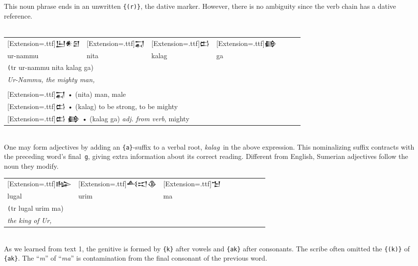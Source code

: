 \documentclass[a4paper,12pt]{book}
\newcommand{\fcn}{\setmainfont{Akkadian}[Extension=.ttf]}
\newcommand{\fcm}{\large\setmainfont{Akkadian}[Extension=.ttf]}
\begin{document}
This noun phrase ends in an unwritten \verb|{(r)}|,
the dative marker. However, there is no ambiguity
since the verb chain has a dative reference.\\

\verb||\\
\begin{tabular}[!h]{l l l l l l l}
  \fcm 𒌨𒀭𒇉 &\fcm 𒍑
  &\fcm 𒆗 &\fcm 𒂵\\
  ur-nammu & nita & kalag & ga\\
  \multicolumn{4}{l}{\texttt (tr ur-nammu nita kalag ga)}\\
  \multicolumn{4}{l}{\em Ur-Nammu, the mighty man,}\\
  \hline\\
  \multicolumn{4}{l}{{\fcn 𒍑} • (nita) man, male}\\
  \multicolumn{4}{l}{{\fcn 𒆗} • (kalag)
    to be strong, to be mighty}\\
  \multicolumn{4}{l}{{\fcn 𒆗 𒂵} • (kalag ga)
    {\em adj. from verb}, mighty}\\
\end{tabular}\verb||\\

One may form adjectives by adding an
\verb|{a}|-suffix to a verbal root,
     {\em kalag} in the above expression.
     This nominalizing suffix contracts with
     the preceding word's final \verb|g|,
     giving extra information about its correct reading.
     Different from English, Sumerian adjectives
     follow the noun they modify.\\

 \newpage
 \noindent    
 \begin{tabular}[!h]{l l l l l l l l l}
   \fcm 𒈗 &\fcm 𒋀𒀊𒆠
   &\fcm 𒈠\\
   lugal & urim & ma\\
   \multicolumn{3}{l}{\texttt (tr lugal urim ma)}\\
   \multicolumn{3}{l}{\em the king of Ur,}\\
 \end{tabular}\verb||\\

 As we learned from text 1, the genitive is
 formed by \verb|{k}| after vowels
 and \verb|{ak}| after consonants.
 The scribe often omitted the \verb|{(k)}|
 of \verb|{ak}|. The ``{\em m}'' of
 ``{\em ma}'' is contamination from the final
 consonant of the previous word.
\end{document}
